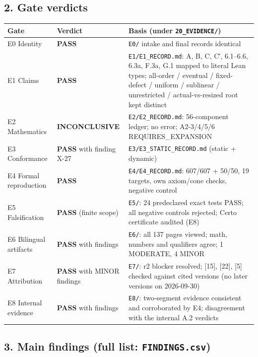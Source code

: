 \documentclass[
]{article}
\newcounter{none} %
\begin{document}
\subsection{2. Gate verdicts}\label{2-gate-verdicts}

{\def\LTcaptype{none} %
\begin{longtable}[]{@{}lll@{}}
\toprule\noalign{}
Gate & Verdict & Basis (under \texttt{20\_EVIDENCE/}) \\
\midrule\noalign{}
\endhead
\bottomrule\noalign{}
\endlastfoot
E0 Identity & \textbf{PASS} & \texttt{E0/} intake and final records
identical \\
E1 Claims & \textbf{PASS} & \texttt{E1/E1\_RECORD.md}: A, B, C, C′,
6.1--6.6, 6.3a, F.3a, G.1 mapped to literal Lean types; all-order /
eventual / fixed-defect / uniform / sublinear / unrestricted /
actual-vs-resized root kept distinct \\
E2 Mathematics & \textbf{INCONCLUSIVE} & \texttt{E2/E2\_RECORD.md}:
56-component ledger; no error; A2-3/4/5/6 REQUIRES\_EXPANSION \\
E3 Conformance & \textbf{PASS} with finding X-27 &
\texttt{E3/E3\_STATIC\_RECORD.md} (static + dynamic) \\
E4 Formal reproduction & \textbf{PASS} & \texttt{E4/E4\_RECORD.md}:
607/607 + 50/50, 19 targets, own axiom/cone checks, negative control \\
E5 Falsification & \textbf{PASS} (finite scope) & \texttt{E5/}: 24
predeclared exact tests PASS; all negative controls rejected; Certo
certificate audited (E8) \\
E6 Bilingual artifacts & \textbf{PASS} with findings & \texttt{E6/}: all
137 pages viewed; math, numbers and qualifiers agree; 1 MODERATE, 4
MINOR \\
E7 Attribution & \textbf{PASS} with MINOR findings & \texttt{E7/}: r2
blocker resolved; {[}15{]}, {[}22{]}, {[}5{]} checked against cited
versions (no later versions on 2026-09-30) \\
E8 Internal evidence & \textbf{PASS} with findings & \texttt{E8/}:
two-segment evidence consistent and corroborated by E4; disagreement
with the internal A.2 verdicts \\
\end{longtable}
}

\subsection{\texorpdfstring{3. Main findings (full list:
\texttt{FINDINGS.csv})}{3. Main findings (full list: FINDINGS.csv)}}\label{3-main-findings-full-list-findingscsv}
\end{document}
